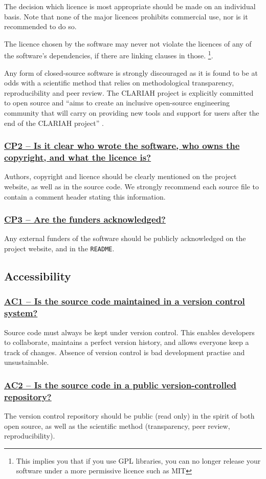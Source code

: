 \documentclass[a4paper,11pt]{article}
\newcommand{\indicator}[1]{\subsubsection*{\underline{#1}}}
\begin{document}
The decision which licence is most appropriate should be made on an individual
basis. Note that none of the major licences prohibits commercial use, nor is it
recommended to do so.

The licence chosen by the software may never not violate the licences of any of
the software's dependencies, if there are linking clauses in those. \footnote{This implies you that if you use GPL libraries, you can no longer release your software under a more permissive licence such as MIT}.

Any form of closed-source software is strongly discouraged as it is found to be
at odds with a scientific method that relies on methodological transparency,
reproducibility and peer review. The CLARIAH project is explicitly committed to
open source and ``aims to create an inclusive open-source engineering community
that will carry on providing new tools and support for users after the end of
the CLARIAH project'' \citep{CLARIAHTECHPLAN1}.


\indicator{CP2 -- Is it clear who wrote the software, who owns the
copyright, and what the licence is?}

Authors, copyright and licence should be clearly mentioned on the project
website, as well as in the source code.  We strongly recommend each source file
to contain a comment header stating this information.

\indicator{CP3 -- Are the funders acknowledged?}

Any external funders of the software should be publicly acknowledged on the project
website, and in the \texttt{README}.

\subsection{Accessibility}

\indicator{AC1 -- Is the source code maintained in a version control system?}

Source code must always be kept under version control. This enables developers
to collaborate, maintains a perfect version history, and allows everyone keep a
track of changes. Absence of version control is bad development practise and
unsustainable.

\indicator{AC2 -- Is the source code in a public version-controlled repository?}

The version control repository should be public (read only) in the spirit of both open
source, as well as the scientific method (transparency, peer review,
reproducibility). 
\end{document}
